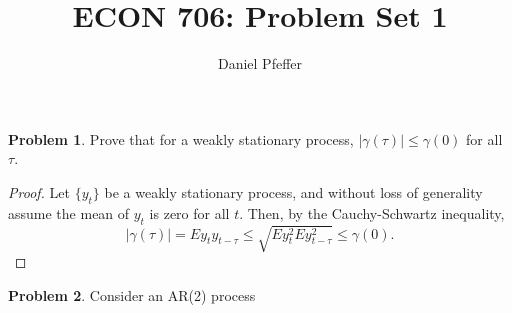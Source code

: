 \documentclass[oneside,reqno]{amsart}
\title{ECON 706: Problem Set 1}
\author{Daniel Pfeffer}
\theoremstyle{definition}
\newtheorem{prob}{Problem}
\begin{document}
\maketitle

\begin{prob}
Prove that for a weakly stationary process, $|\gamma(\tau)| \leq \gamma(0)$ for all $\tau$.
\end{prob}

\begin{proof}
Let $\{y_t\}$ be a weakly stationary process, and without loss of generality assume the mean of $y_t$ is zero for all $t$. Then, by the Cauchy-Schwartz inequality, 
\[
	| \gamma(\tau) | = E y_t y_{t-\tau} \leq \sqrt{E y_t^2 E y_{t-\tau}^2} \leq \gamma(0).
\]
\end{proof}

\begin{prob}
Consider an AR(2) process
\end{prob}
\end{document}
